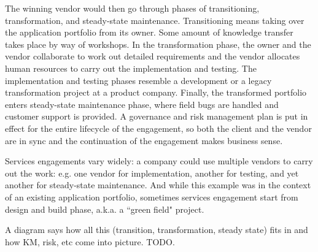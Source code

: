 The winning vendor would then go through phases of transitioning, transformation, and steady-state maintenance. Transitioning means taking over the application portfolio from its owner. Some amount of knowledge transfer takes place by way of workshops. In the transformation phase, the owner and the vendor collaborate to work out detailed requirements and the vendor allocates human resources to carry out the implementation and testing. The implementation and testing phases resemble a development or a legacy transformation project at a product company.  Finally, the transformed portfolio enters steady-state maintenance phase, where field bugs are handled and customer support is provided.  A governance and risk management plan is put in effect for the entire lifecycle of the engagement, so both the client and the vendor are in sync and the continuation of the engagement makes business sense.

Services engagements vary widely: a company could use multiple vendors to carry out the work: e.g. one vendor for implementation, another for testing, and yet another for steady-state maintenance.  And while this example was in the context of an existing application portfolio, sometimes services engagement start from design and build phase, a.k.a. a ``green field" project.


%
%
%

A diagram says how all this (transition, transformation, steady state) fits in and how KM, risk, etc come into picture. TODO.

